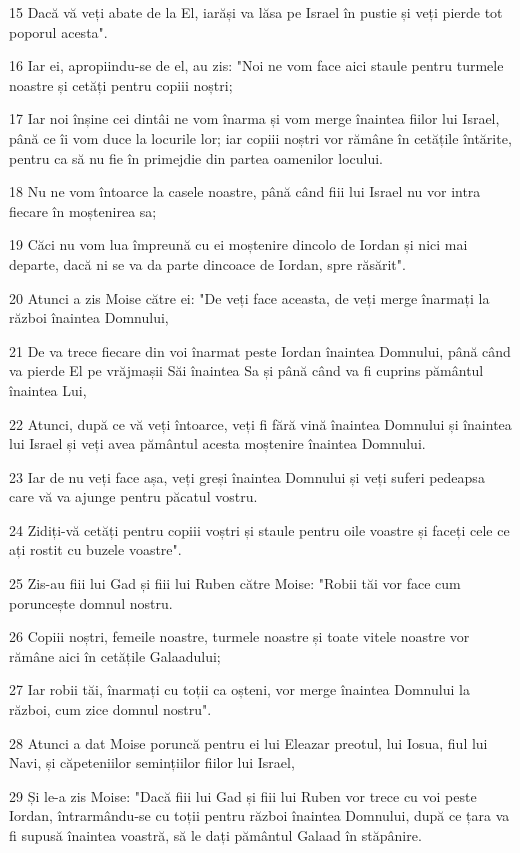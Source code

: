 \par 15 Dacă vă veți abate de la El, iarăși va lăsa pe Israel în pustie și veți pierde tot poporul acesta".
\par 16 Iar ei, apropiindu-se de el, au zis: "Noi ne vom face aici staule pentru turmele noastre și cetăți pentru copiii noștri;
\par 17 Iar noi înșine cei dintâi ne vom înarma și vom merge înaintea fiilor lui Israel, până ce îi vom duce la locurile lor; iar copiii noștri vor rămâne în cetățile întărite, pentru ca să nu fie în primejdie din partea oamenilor locului.
\par 18 Nu ne vom întoarce la casele noastre, până când fiii lui Israel nu vor intra fiecare în moștenirea sa;
\par 19 Căci nu vom lua împreună cu ei moștenire dincolo de Iordan și nici mai departe, dacă ni se va da parte dincoace de Iordan, spre răsărit".
\par 20 Atunci a zis Moise către ei: "De veți face aceasta, de veți merge înarmați la război înaintea Domnului,
\par 21 De va trece fiecare din voi înarmat peste Iordan înaintea Domnului, până când va pierde El pe vrăjmașii Săi înaintea Sa și până când va fi cuprins pământul înaintea Lui,
\par 22 Atunci, după ce vă veți întoarce, veți fi fără vină înaintea Domnului și înaintea lui Israel și veți avea pământul acesta moștenire înaintea Domnului.
\par 23 Iar de nu veți face așa, veți greși înaintea Domnului și veți suferi pedeapsa care vă va ajunge pentru păcatul vostru.
\par 24 Zidiți-vă cetăți pentru copiii voștri și staule pentru oile voastre și faceți cele ce ați rostit cu buzele voastre".
\par 25 Zis-au fiii lui Gad și fiii lui Ruben către Moise: "Robii tăi vor face cum poruncește domnul nostru.
\par 26 Copiii noștri, femeile noastre, turmele noastre și toate vitele noastre vor rămâne aici în cetățile Galaadului;
\par 27 Iar robii tăi, înarmați cu toții ca oșteni, vor merge înaintea Domnului la război, cum zice domnul nostru".
\par 28 Atunci a dat Moise poruncă pentru ei lui Eleazar preotul, lui Iosua, fiul lui Navi, și căpeteniilor semințiilor fiilor lui Israel,
\par 29 Și le-a zis Moise: "Dacă fiii lui Gad și fiii lui Ruben vor trece cu voi peste Iordan, întrarmându-se cu toții pentru război înaintea Domnului, după ce țara va fi supusă înaintea voastră, să le dați pământul Galaad în stăpânire.
